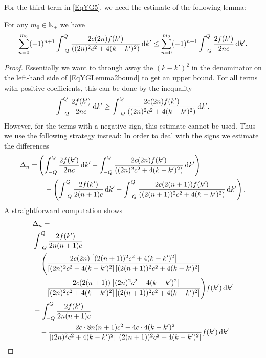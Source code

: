 For the third term in \eqref{EqYG5}, we need the estimate of the following lemma:
\begin{lemma} \label{LemmaYGbound:f}
	For any $ m_0\in\mathbb{N}_+ $ we have 
	\begin{equation}\label{EqYGLemma2bound}
		\sum_{n=0}^{m_0}(-1)^{n+1}\int_{-Q}^{Q}\frac{2c(2n) f(k')}{((2n)^2c^2+4(k-k')^2)}\mathop{}\!\mathrm{d} k'\leq \sum_{n=0}^{m_0}(-1)^{n+1}\int_{-Q}^{Q}\frac{2 f(k')}{2nc}\mathop{}\!\mathrm{d} k'.
	\end{equation}
\end{lemma}
\begin{proof}
Essentially we want to through away the $ (k-k')^2 $ in the denominator on the left-hand side of \eqref{EqYGLemma2bound} to get an upper bound. For all terms with positive coefficients, this can be done by the inequality
\begin{equation}\label{EqYGLemma2bound2}
\int_{-Q}^{Q}\frac{2 f(k')}{2nc}\mathop{}\!\mathrm{d} k'\geq \int_{-Q}^{Q}\frac{2c(2n) f(k')}{((2n)^2c^2+4(k-k')^2)}\mathop{}\!\mathrm{d} k'.
\end{equation}
However, for the terms with a negative sign, this estimate cannot be used. Thus we use the following strategy instead:
 In order to deal with the signs we estimate the differences
\begin{equation}
	\begin{aligned}
	\Delta_n=&\left(\int_{-Q}^{Q}\frac{2 f(k')}{2nc}\mathop{}\!\mathrm{d} k'-\int_{-Q}^{Q}\frac{2c(2n) f(k')}{((2n)^2c^2+4(k-k')^2)}\mathop{}\!\mathrm{d} k'\right)\\
	&\quad-\left(\int_{-Q}^{Q}\frac{2 f(k')}{2(n+1)c}\mathop{}\!\mathrm{d} k'-\int_{-Q}^{Q}\frac{2c(2(n+1)) f(k')}{((2(n+1))^2c^2+4(k-k')^2)}\mathop{}\!\mathrm{d} k'\right).
	\end{aligned}
\end{equation}
A straightforward computation shows\begin{equation}
\begin{aligned}
&\Delta_n=\\
&\int_{-Q}^{Q} \frac{2 f(k')}{2n(n+1)c}\\&-\Bigg(\frac{2c(2n)\left[(2(n+1))^2c^2+4(k-k')^2\right]}{\left[(2n)^2c^2+4(k-k')^2\right]\left[(2(n+1))^2c^2+4(k-k')^2\right]}\\
&\qquad \frac{-2c(2(n+1))\left[(2n)^2c^2+4(k-k')^2\right]}{\left[(2n)^2c^2+4(k-k')^2\right]\left[(2(n+1))^2c^2+4(k-k')^2\right]}\Bigg) f(k')\diff k'\\
&=\int_{-Q}^{Q}\frac{2 f(k')}{2n(n+1)c}\\&\quad -\frac{2c\cdot  8n (n+1)c^2-4c\cdot 4(k-k')^2}{\left[(2n)^2c^2+4(k-k')^2\right]\left[(2(n+1))^2c^2+4(k-k')^2\right]} f(k')\diff k'\\

\end{aligned}
\end{equation}
\end{proof}
